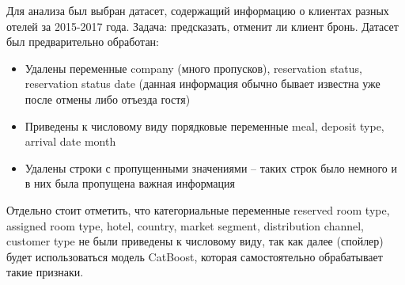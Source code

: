 Для анализа был выбран датасет, содержащий информацию о клиентах разных отелей за 2015-2017 года. Задача: предсказать, отменит ли клиент бронь. Датасет был предварительно обработан:
\begin{itemize}
	\item Удалены переменные company (много пропусков), reservation status, reservation status date (данная информация обычно бывает известна уже после отмены либо отъезда гостя)
	\item Приведены к числовому виду порядковые переменные meal, deposit type, arrival date month
	\item Удалены строки с пропущенными значениями -- таких строк было немного и в них была пропущена важная информация
\end{itemize}

Отдельно стоит отметить, что категориальные переменные reserved room type, assigned room type, hotel, country, market segment, distribution channel, customer type не были приведены к числовому виду, так как далее (спойлер) будет использоваться модель CatBoost, которая самостоятельно обрабатывает такие признаки.